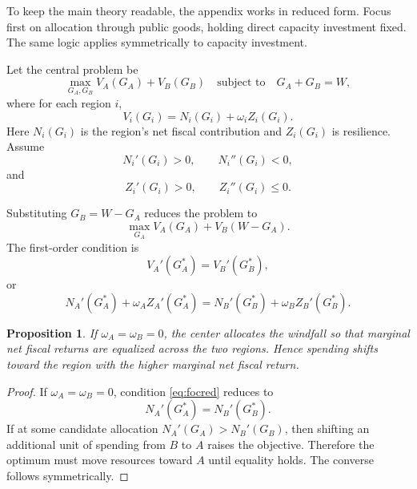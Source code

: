 \documentclass[12pt]{article}
\newtheorem{proposition}{Proposition}
\begin{document}
To keep the main theory readable, the appendix works in reduced form. Focus first on allocation through public goods, holding direct capacity investment fixed. The same logic applies symmetrically to capacity investment.

Let the central problem be
\begin{equation}
\max_{G_A,G_B} V_A(G_A) + V_B(G_B) \quad \text{subject to} \quad G_A + G_B = W,
\end{equation}
where for each region $i$,
\begin{equation}
V_i(G_i) = N_i(G_i) + \omega_i Z_i(G_i).
\end{equation}
Here $N_i(G_i)$ is the region's net fiscal contribution and $Z_i(G_i)$ is resilience. Assume
\begin{equation}
N_i'(G_i) > 0, \qquad N_i''(G_i) < 0,
\end{equation}
and
\begin{equation}
Z_i'(G_i) > 0, \qquad Z_i''(G_i) \le 0.
\end{equation}

Substituting $G_B = W-G_A$ reduces the problem to
\begin{equation}
\max_{G_A} V_A(G_A) + V_B(W-G_A).
\end{equation}
The first-order condition is
\begin{equation}
V_A'(G_A^*) = V_B'(G_B^*),
\end{equation}
or
\begin{equation}
N_A'(G_A^*) + \omega_A Z_A'(G_A^*) = N_B'(G_B^*) + \omega_B Z_B'(G_B^*).
\label{eq:focred}
\end{equation}

\begin{proposition}
If $\omega_A = \omega_B = 0$, the center allocates the windfall so that marginal net fiscal returns are equalized across the two regions. Hence spending shifts toward the region with the higher marginal net fiscal return.
\end{proposition}

\begin{proof}
If $\omega_A = \omega_B = 0$, condition \eqref{eq:focred} reduces to
\begin{equation}
N_A'(G_A^*) = N_B'(G_B^*).
\end{equation}
If at some candidate allocation $N_A'(G_A) > N_B'(G_B)$, then shifting an additional unit of spending from $B$ to $A$ raises the objective. Therefore the optimum must move resources toward $A$ until equality holds. The converse follows symmetrically.\qedhere
\end{proof}
\end{document}
